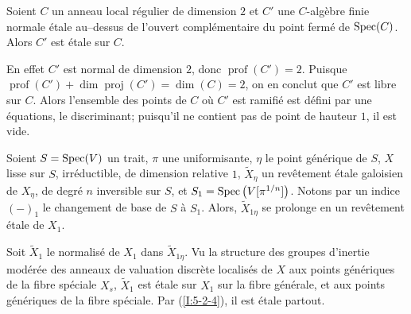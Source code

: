 \begin{lemma} \label{I:5-2-4} %
Soient $C$ un anneau local régulier de dimension $2$ et $C'$ une $C$-algèbre 
finie normale étale au--dessus de l'ouvert complémentaire du point fermé 
de $\operatorname{Spec}(C)$. Alors $C'$ est étale sur $C$.
\end{lemma}

En effet $C'$ est normal de dimension $2$, donc $\operatorname{prof}(C')=2$. 
Puisque $\operatorname{prof}(C')+\dim\operatorname{proj}(C') = \dim(C)=2$, on 
en conclut que $C'$ est libre sur $C$. Alors l'ensemble des points de $C$ où 
$C'$ est ramifié est défini par une équations, le discriminant; puisqu'il 
ne contient pas de point de hauteur $1$, il est vide. 





\begin{lemma}\label{I:5-2-5} %
Soient $S=\operatorname{Spec}(V)$ un trait, $\pi$ une uniformisante, $\eta$ le point 
générique de $S$, $X$ lisse sur $S$, irréductible, de dimension 
relative $1$, $\widetilde X_\eta$ un revêtement étale galoisien de $X_\eta$, 
de degré $n$ inversible sur $S$, et $S_1=\operatorname{Spec}\left(V[\pi^{1/n}]\right)$. 
Notons par un indice $(-)_1$ le changement de base de $S$ à $S_1$. Alors, 
$\widetilde X_{1\eta}$ se prolonge en un revêtement étale de $X_1$. 
\end{lemma}

Soit $\widetilde X_1$ le normalisé de $X_1$ dans $\widetilde X_{1\eta}$. Vu la 
structure des groupes d'inertie modérée des anneaux de valuation discrète 
localisés de $X$ aux points génériques de la fibre spéciale $X_s$, 
$\widetilde X_1$ est étale sur $X_1$ sur la fibre générale, et aux points 
génériques de la fibre spéciale. Par (\ref{I:5-2-4}), il est étale 
partout. 





\subsubsection{}\label{I:5-2-6} %

